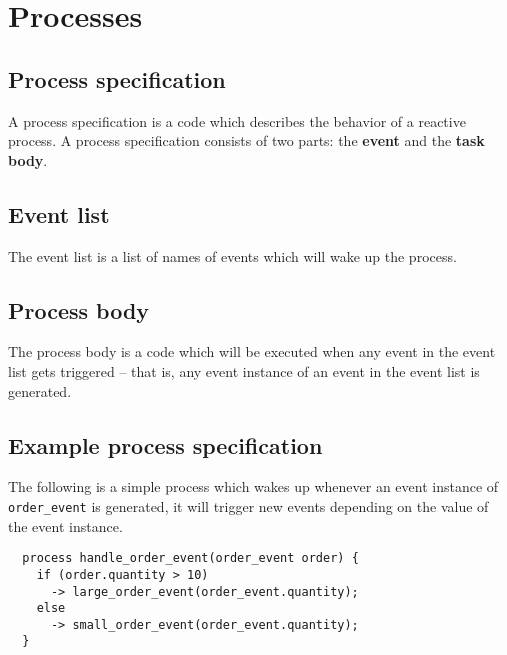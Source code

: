 \documentclass{pamsbook}
\begin{document}
\section{Processes}

\subsection{Process specification}
A process specification is a code which describes the behavior of a reactive
process. A process specification consists of two parts: the
{\bf event\/} and the {\bf task body\/}.  

\subsection{Event list}
The event list is a list of
names of events which will wake up the process. 

\subsection{Process body} The process body is a code
which will be executed when any event in the event list gets triggered -- that
is, any event instance of an event in the event list is generated.

\subsection{Example process specification}
The following is a simple process which wakes up whenever an event instance of
\verb+order_event+ is generated, it will trigger new events depending on the
value of the event instance.

\begin{verbatim}
  process handle_order_event(order_event order) {
    if (order.quantity > 10)
      -> large_order_event(order_event.quantity);
    else
      -> small_order_event(order_event.quantity);
  }
\end{verbatim}


\end{document}
